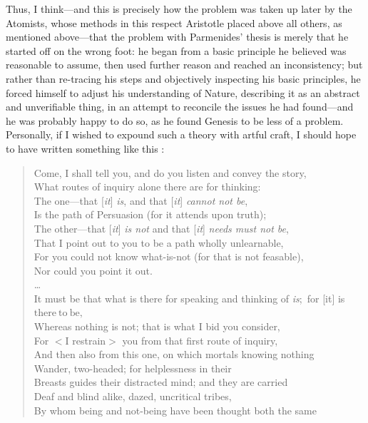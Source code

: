 Thus, I think---and this is precisely how the problem was taken up later by the Atomists, whose methods in this respect Aristotle placed above all others, as mentioned above---that the problem with Parmenides' thesis is merely that he started off on the wrong foot: he began from a basic principle he believed was reasonable to assume, then used further reason and reached an inconsistency; but rather than re-tracing his steps and objectively inspecting his basic principles, he forced himself to adjust his understanding of Nature, describing it as an abstract and unverifiable thing, in an attempt to reconcile the issues he had found---and he was probably happy to do so, as he found Genesis to be less of a problem. Personally, if I wished to expound such a theory with artful craft, I should hope to have written something like this \cite{Gallop1984}:
\begin{quotation}
\noindent Come, I shall tell you, and do you listen and convey the story,\\
What routes of inquiry alone there are for thinking:\\
The one---that [\textit{it}] \textit{is}, and that [\textit{it}] \textit{cannot not be},\\
Is the path of Persuasion (for it attends upon truth);\\
The other---that [\textit{it}] \textit{is not} and that [\textit{it}] \textit{needs must not be},\\
That I point out to you to be a path wholly unlearnable,\\
For you could not know what-is-not (for that is not feasable),\\
Nor could you point it out.\\
\ldots\\
It must be that what is there for speaking and thinking of \textit{is};~for [it] is $\mathrm{there\!~to\!~be,}$\\
Whereas nothing is not; that is what I bid you consider,\\
For $<$I restrain$>$ you from that first route of inquiry,\\
And then also from this one, on which mortals knowing nothing\\
Wander, two-headed; for helplessness in their\\
Breasts guides their distracted mind; and they are carried\\
Deaf and blind alike, dazed, uncritical tribes,\\
By whom being and not-being have been thought both the same\\

\end{quotation}
